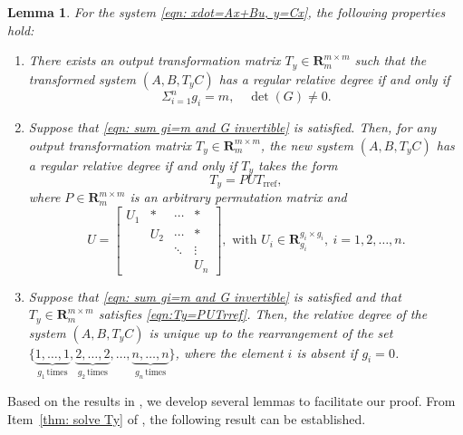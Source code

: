 \documentclass[sort&compress]{elsarticle}
\newtheorem{lemma}{Lemma}
\newcommand\R{\mathbf R}
\begin{document}
\begin{lemma}\label{thm:rrdrefresult}
\emph{\cite{Cao2025rrdref[J]}}
For the system \eqref{eqn: xdot=Ax+Bu, y=Cx}, the following properties hold:
\begin{enumerate}

\item\label{thm: rrd iff detG not 0}
There exists an output transformation matrix $T_y \in \R^{m \times m}_m$
such that the transformed system $(A,B,T_yC)$
has a regular relative degree if and only if
\begin{equation}\label{eqn: sum gi=m and G invertible}
\Sigma_{i=1}^n g_i = m, \quad \det(G) \neq 0.
\end{equation}

\item\label{thm: solve Ty}
Suppose that \eqref{eqn: sum gi=m and G invertible} is satisfied.
Then, for any output transformation matrix $T_y \in \R_m^{m \times m}$,
the new system $(A,B,T_yC)$ has a regular relative degree if and only
if $T_y$ takes the form
\begin{equation}\label{eqn:Ty=PUTrref}
T_y = PUT_\mathrm{rref},
\end{equation}
where $P \in \R^{m \times m}_m$ is an arbitrary permutation matrix and
\begin{equation}\label{eqn: U=?}
U = \begin{bmatrix}
	U_1 & * & \cdots & * \\
	& U_2 & \cdots & * \\
	& & \ddots & \vdots \\
	& & & U_n
\end{bmatrix},
\text{ with $U_i \in \R^{g_i \times g_i}_{g_i}, \ i=1,2,\dots,n$.}
\end{equation}

\item\label{thm: relative degree=?}
Suppose that \eqref{eqn: sum gi=m and G invertible} is satisfied
and that $T_y \in \R^{m \times m}_m$ satisfies \eqref{eqn:Ty=PUTrref}.
Then, the relative degree of the system $(A,B,T_yC)$ is unique
up to the rearrangement of the set
$\{\underbrace{1,\dots,1}_{g_1\,\mathrm{times}},
\underbrace{2,\dots,2}_{g_2\,\mathrm{times}},\dots,
\underbrace{n,\dots,n}_{g_n\,\mathrm{times}}\}$,
where the element $i$ is absent if $g_i=0$.

\end{enumerate}
\end{lemma}

Based on the results in \cite{Cao2025rrdref[J]},
we develop several lemmas to facilitate our proof.
From Item~\ref{thm: solve Ty} of ,
the following result can be established.
\end{document}
